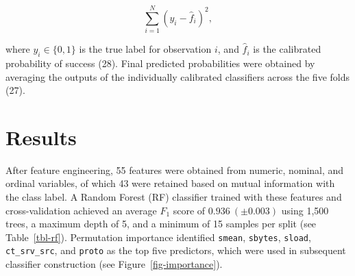 \documentclass[
  a4paper,
]{scrreprt}
\begin{document}
\[
\sum_{i=1}^N (y_i - \hat{f}_i)^2,
\]

where \(y_i \in \{0,1\}\) is the true label for observation \(i\), and
\(\hat{f}_i\) is the calibrated probability of success (28). Final
predicted probabilities were obtained by averaging the outputs of the
individually calibrated classifiers across the five folds (27).


\chapter{Results}\label{results}

After feature engineering, 55 features were obtained from numeric,
nominal, and ordinal variables, of which 43 were retained based on
mutual information with the class label. A Random Forest (RF) classifier
trained with these features and cross-validation achieved an average
\(F_1\) score of \(0.936 \ (\pm 0.003)\) using 1,500 trees, a maximum
depth of 5, and a minimum of 15 samples per split (see
Table~\ref{tbl-rf}). Permutation importance identified \texttt{smean},
\texttt{sbytes}, \texttt{sload}, \texttt{ct\_srv\_src}, and
\texttt{proto} as the top five predictors, which were used in subsequent
classifier construction (see Figure~\ref{fig-importance}).

\scriptsize
\end{document}
